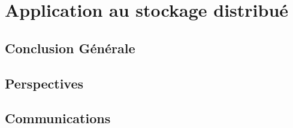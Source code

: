 
%


%

\part{Application au stockage distribué}


%


%


%


%


%

\chapter*{Conclusion Générale}



%

\chapter*{Perspectives}



%

\endrefsegment

\chapter*{Communications}



%

\printbibliography[
    heading=bibintoc,
    segment=1
]




\backmatter


